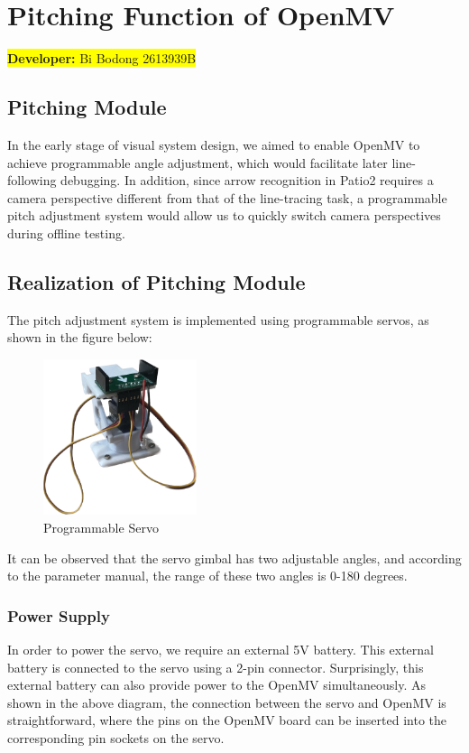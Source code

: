 \documentclass[12pt, a4paper, oneside]{report}
\begin{document}
\newpage
\section{Pitching Function of OpenMV}\label{sec:Pitch}
\colorbox{yellow}{\textbf{Developer:} Bi Bodong 2613939B}
	
\subsection{Pitching Module}

In the early stage of visual system design, we aimed to enable OpenMV to achieve programmable angle adjustment, which would facilitate later line-following debugging. In addition, since arrow recognition in Patio2 requires a camera perspective different from that of the line-tracing task, a programmable pitch adjustment system would allow us to quickly switch camera perspectives during offline testing.

\subsection{Realization of Pitching Module}
The pitch adjustment system is implemented using programmable servos, as shown in the figure below:

\begin{figure}[H]
  \centering
  \includegraphics[width=0.4\textwidth]{pic/servo.png}
  \caption{Programmable Servo}
  \label{fig:servo-1}
\end{figure}

 It can be observed that the servo gimbal has two adjustable angles, and according to the parameter manual, the range of these two angles is 0-180 degrees.
 
 \subsubsection*{Power Supply}
In order to power the servo, we require an external 5V battery. This external battery is connected to the servo using a 2-pin connector. Surprisingly, this external battery can also provide power to the OpenMV simultaneously. As shown in the above diagram, the connection between the servo and OpenMV is straightforward, where the pins on the OpenMV board can be inserted into the corresponding pin sockets on the servo.
\end{document}
